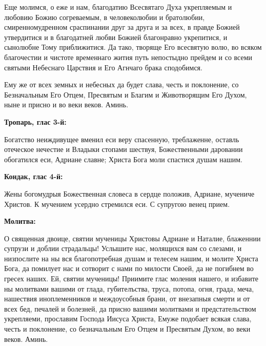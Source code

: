 Еще молимся, о еже и нам, благодатию Всесвятаго Духа укрепляемым и любовию Божию согреваемым, в человеколюбии и братолюбии, смиренномудренном сраспинании друг за друга и за всех, в правде Божией утвердитися и в благодатней любви Божией благонравно укрепитися, и сынолюбне Тому приближитися. Да тако, творяще Его всесвятую волю, во всяком благочестии и чистоте временнаго жития путь непостыдно прейдем и со всеми святыми Небеснаго Царствия и Его Агнчаго брака сподобимся. 


Ему же от всех земных и небесных да будет слава, честь и поклонение, со Безначальным Его Отцем, Пресвятым и Благим и Животворящим Его Духом, ныне и присно и во веки веков. Аминь.


\bigskip\bigskip\mychapterending

 
\bfseries Тропарь, глас 3-й:\normalfont{}

Богатство неиждивущее вменил еси веру спасенную, треблаженне, оставль отеческое нечестие и Владыки стопами шествуя, Божественными даровании обогатился еси, Адриане славне; Христа Бога моли спастися душам нашим.


\medskip
\bfseries Кондак, глас 4-й:\normalfont{}


Жены богомудрыя Божественная словеса в сердце положив, Адриане, мучениче Христов. К мучением усердно стремился еси. С супругою венец прием.


\medskip
\bfseries Молитва:\normalfont{}


О священная двоице, святии мученицы Христовы Адриане и Наталие, блаженнии супрузи и доблии страдальцы! Услышите нас, молящихся вам со слезами, и низпослите на ны вся благопотребная душам и телесем нашим, и молите Христа Бога, да помилует нас и сотворит с нами по милости Своей, да не погибнем во гресех наших. Ей, святии мученицы! Приимите глас моления нашего, и избавите ны молитвами вашими от глада, губителъства, труса, потопа, огня, града, меча, нашествия иноплеменников и междоусобныя брани, от внезапныя смерти и от всех бед, печалей и болезней, да присно вашими молитвами и предстательством укрепляеми, прославим Господа Иисуса Христа, Емуже подобает всякая слава, честь и поклонение, со безначальным Его Отцем и Пресвятым Духом, во веки веков. Аминь.

\bigskip\bigskip\mychapterending

 
